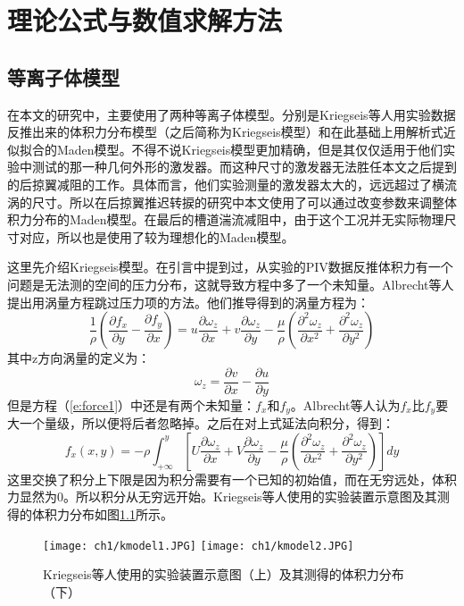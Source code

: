 \chapter{理论公式与数值求解方法}
\label{cha:2}
\section{等离子体模型}
在本文的研究中，主要使用了两种等离子体模型。分别是Kriegseis等人\cite{kriegseis2013velocity}用实验数据反推出来的体积力分布模型（之后简称为Kriegseis模型）和在此基础上用解析式近似拟合的Maden模型\cite{Maden2013}。不得不说Kriegseis模型更加精确，但是其仅仅适用于他们实验中测试的那一种几何外形的激发器。而这种尺寸的激发器无法胜任本文之后提到的后掠翼减阻的工作。具体而言，他们实验测量的激发器太大的，远远超过了横流涡的尺寸。所以在后掠翼推迟转捩的研究中本文使用了可以通过改变参数来调整体积力分布的Maden模型。在最后的槽道湍流减阻中，由于这个工况并无实际物理尺寸对应，所以也是使用了较为理想化的Maden模型。

这里先介绍Kriegseis模型。在引言中提到过，从实验的PIV数据反推体积力有一个问题是无法测的空间的压力分布，这就导致方程中多了一个未知量。Albrecht等人\cite{albrecht2011method}提出用涡量方程跳过压力项的方法。他们推导得到的涡量方程为：
\begin{equation}\label{e:force1}
\frac{1}{\rho} \left( \frac{\partial f_x}{\partial y}-\frac{\partial f_y}{\partial x} \right)=  {u\frac{{\partial \omega_z }}
{{\partial x}} + v\frac{{\partial \omega_z }}
{{\partial y}} - \frac{\mu }
{\rho }\left( {\frac{{\partial ^2 \omega_z }}
{{\partial x^2 }} + \frac{{\partial ^2 \omega_z }}
{{\partial y^2 }}} \right)}
\end{equation}
其中z方向涡量的定义为：
\begin{equation}\label{e:vorticity}
  \omega_z=\frac{\partial v}{\partial x}-\frac{\partial u}{\partial y}
\end{equation}
但是方程（\ref{e:force1}）中还是有两个未知量：$f_x$和$f_y$。Albrecht等人\cite{albrecht2011method}认为$f_x$比$f_y$要大一个量级，所以便将后者忽略掉。之后在对上式延法向积分，得到：
\begin{equation}\label{e:force3}
f_x(x,y) =  - \rho \int_{+\infty} ^y {\left[ {U\frac{{\partial \omega_z }}
{{\partial x}} + V\frac{{\partial \omega_z }}
{{\partial y}} - \frac{\mu }
{\rho }\left( {\frac{{\partial ^2 \omega_z }}
{{\partial x^2 }} + \frac{{\partial ^2 \omega_z }}
{{\partial y^2 }}} \right)} \right]dy}
\end{equation}
这里交换了积分上下限是因为积分需要有一个已知的初始值，而在无穷远处，体积力显然为0。所以积分从无穷远开始。Kriegseis等人\cite{kriegseis2013velocity}使用的实验装置示意图及其测得的体积力分布如图\ref{f:kmodel}所示。
\begin{figure}
  \centering
  \texttt{[image: ch1/kmodel1.JPG]}
  \texttt{[image: ch1/kmodel2.JPG]}
  \caption{Kriegseis等人\cite{kriegseis2013velocity}使用的实验装置示意图（上）及其测得的体积力分布（下）}\label{f:kmodel}
\end{figure}

